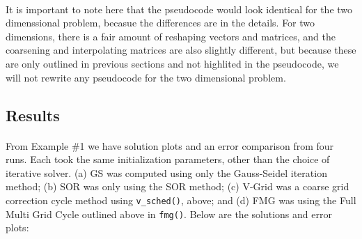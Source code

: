 \documentclass[pdftex,12pt,a4paper]{article}
\begin{document}
        \paragraph*{} It is important to note here that the pseudocode would look identical for the two dimenssional problem, becasue the differences are in the details. For two dimensions, there is a fair amount of reshaping vectors and matrices, and the coarsening and interpolating matrices are also slightly different, but because these are only outlined in previous sections and not highlited in the pseudocode, we will not rewrite any pseudocode for the two dimensional problem. 

    \subsection{Results}

        \paragraph*{} From Example \#1 we have solution plots and an error comparison from four runs. Each took the same initialization parameters, other than the choice of iterative solver. (a) GS was computed using only the Gauss-Seidel iteration method; (b) SOR was only using the SOR method; (c) V-Grid was a coarse grid correction cycle method using \lstinline{v_sched()}, above; and (d) FMG was using the Full Multi Grid Cycle outlined above in \lstinline{fmg()}. Below are the solutions and error plots:
\end{document}
